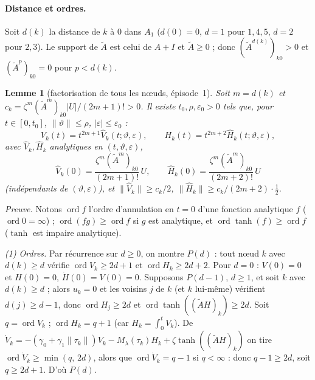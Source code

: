 \documentclass[11pt,a4paper]{article}
\newtheorem{lemme}{Lemme}
\theoremstyle{remark}
\newcommand{\vth}{\vartheta}
\begin{document}
\paragraph{Distance et ordres.} Soit $d(k)$ la distance de $k$ \`a $0$ dans $A_1$ ($d(0)=0$, $d=1$ pour $1,4,5$, $d=2$ pour $2,3$). Le support de $\tilde A$ est celui de $A+I$ et $\tilde A\ge0$ ; donc $(\tilde A^{d(k)})_{k0}>0$ et $(\tilde A^{p})_{k0}=0$ pour $p<d(k)$.

\begin{lemme}[factorisation de tous les n\oe uds, \'episode~1]\label{lem:fact}
Soit $m=d(k)$ et $c_k=\zeta^m(\tilde A^m)_{k0}\lvert U\rvert/(2m+1)!>0$. Il existe $t_0,\rho,\varepsilon_0>0$ tels que, pour $t\in[0,t_0]$, $\lVert\vth\rVert\le\rho$, $\lvert\varepsilon\rvert\le\varepsilon_0$ :
\[ V_k(t)=t^{2m+1}\hat V_k(t;\vth,\varepsilon),\qquad H_k(t)=t^{2m+2}\hat H_k(t;\vth,\varepsilon), \]
avec $\hat V_k,\hat H_k$ analytiques en $(t,\vth,\varepsilon)$,
\[ \hat V_k(0)=\frac{\zeta^m(\tilde A^m)_{k0}}{(2m+1)!}\,U,\qquad \hat H_k(0)=\frac{\zeta^m(\tilde A^m)_{k0}}{(2m+2)!}\,U \]
(\emph{ind\'ependants de $(\vth,\varepsilon)$}), et $\lVert\hat V_k\rVert\ge c_k/2$, $\lVert\hat H_k\rVert\ge c_k/(2m+2)\cdot\tfrac12$.
\end{lemme}

\noindent\emph{Preuve.} Notons $\operatorname{ord}f$ l'ordre d'annulation en $t=0$ d'une fonction analytique $f$ ($\operatorname{ord}0=\infty$) ; $\operatorname{ord}(fg)\ge\operatorname{ord}f$ si $g$ est analytique, et $\operatorname{ord}\tanh(f)\ge\operatorname{ord}f$ ($\tanh$ est impaire analytique).

\emph{(1) Ordres.} Par r\'ecurrence sur $d\ge0$, on montre $P(d)$ : tout n\oe ud $k$ avec $d(k)\ge d$ v\'erifie $\operatorname{ord}V_k\ge2d+1$ et $\operatorname{ord}H_k\ge2d+2$. Pour $d=0$ : $V(0)=0$ et $H(0)=0$, $\dot H(0)=V(0)=0$. Supposons $P(d-1)$, $d\ge1$, et soit $k$ avec $d(k)\ge d$ ; alors $u_k=0$ et les voisins $j$ de $k$ (et $k$ lui-m\^eme) v\'erifient $d(j)\ge d-1$, donc $\operatorname{ord}H_j\ge2d$ et $\operatorname{ord}\tanh((\tilde AH)_k)\ge2d$. Soit $q=\operatorname{ord}V_k$ ; $\operatorname{ord}H_k=q+1$ (car $H_k=\int_0^tV_k$). De $\dot V_k=-(\gamma_0+\gamma_1\lVert\tau_k\rVert)V_k-M_\lambda(\tau_k)H_k+\zeta\tanh((\tilde AH)_k)$ on tire $\operatorname{ord}\dot V_k\ge\min(q,\,2d)$, alors que $\operatorname{ord}\dot V_k=q-1$ si $q<\infty$ : donc $q-1\ge2d$, soit $q\ge2d+1$. D'o\`u $P(d)$.
\end{document}
